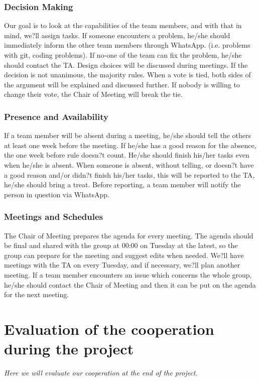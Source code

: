 \subsubsection{Decision Making}
Our goal is to look at the capabilities of the team members, and with that in mind, we?ll assign tasks. If someone encounters a problem, he/she should immediately inform the other team members through WhatsApp. (i.e. problems with git, coding problems). If no-one of the team can fix the problem, he/she should contact the TA. Design choices will be discussed during meetings. If the decision is not unanimous, the majority rules. When a vote is tied, both sides of the argument will be explained and discussed further. If nobody is willing to change their vote, the Chair of Meeting will break the tie.

\subsubsection{Presence and Availability}
If a team member will be absent during a meeting, he/she should tell the others at least one week before the meeting. If he/she has a good reason for the absence, the one week before rule doesn?t count. He/she should finish his/her tasks even when he/she is absent. When someone is absent, without telling, or doesn?t have a good reason and/or didn?t finish his/her tasks, this will be reported to the TA, he/she should bring a treat. Before reporting, a team member will notify the person in question via WhatsApp.
\subsubsection{Meetings and Schedules}
The Chair of Meeting prepares the agenda for every meeting.
The agenda should be final and shared with the group at 00:00 on Tuesday at the latest, so the group can prepare for the meeting and suggest edits when needed.
We?ll have meetings with the TA on every Tuesday, and if necessary, we?ll plan another meeting. If a team member encounters an issue which concerns the whole group, he/she should contact the Chair of Meeting and then it can be put on the agenda for the next meeting.

\section{Evaluation of the cooperation during the project}
\textit{Here we will evaluate our cooperation at the end of the project.}

